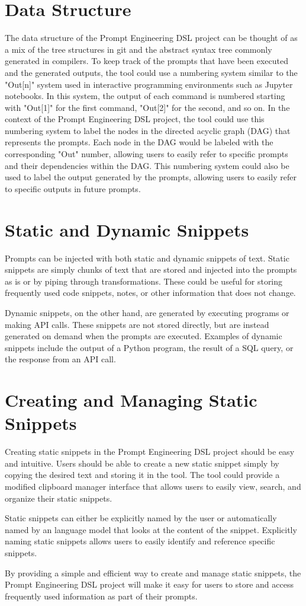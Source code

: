 \documentclass{article}
\begin{document}
\section{Data Structure}
The data structure of the Prompt Engineering DSL project can be thought of as a mix of the tree structures in git and the abstract syntax tree commonly generated in compilers. To keep track of the prompts that have been executed and the generated outputs, the tool could use a numbering system similar to the "Out[n]" system used in interactive programming environments such as Jupyter notebooks. In this system, the output of each command is numbered starting with "Out[1]" for the first command, "Out[2]" for the second, and so on. In the context of the Prompt Engineering DSL project, the tool could use this numbering system to label the nodes in the directed acyclic graph (DAG) that represents the prompts. Each node in the DAG would be labeled with the corresponding "Out" number, allowing users to easily refer to specific prompts and their dependencies within the DAG. This numbering system could also be used to label the output generated by the prompts, allowing users to easily refer to specific outputs in future prompts. 

\section{Static and Dynamic Snippets}
Prompts can be injected with both static and dynamic snippets of text. Static snippets are simply chunks of text that are stored and injected into the prompts as is or by piping through transformations. These could be useful for storing frequently used code snippets, notes, or other information that does not change.

Dynamic snippets, on the other hand, are generated by executing programs or making API calls. These snippets are not stored directly, but are instead generated on demand when the prompts are executed. Examples of dynamic snippets include the output of a Python program, the result of a SQL query, or the response from an API call.

\section{Creating and Managing Static Snippets}
Creating static snippets in the Prompt Engineering DSL project should be easy and intuitive. Users should be able to create a new static snippet simply by copying the desired text and storing it in the tool. The tool could provide a modified clipboard manager interface that allows users to easily view, search, and organize their static snippets.

Static snippets can either be explicitly named by the user or automatically named by an language model that looks at the content of the snippet. Explicitly naming static snippets allows users to easily identify and reference specific snippets. 

By providing a simple and efficient way to create and manage static snippets, the Prompt Engineering DSL project will make it easy for users to store and access frequently used information as part of their prompts.
\end{document}
